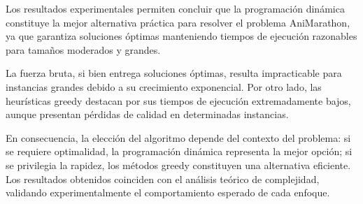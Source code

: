 Los resultados experimentales permiten concluir que la programación dinámica constituye la mejor alternativa práctica para resolver el problema AniMarathon, ya que garantiza soluciones óptimas manteniendo tiempos de ejecución razonables para tamaños moderados y grandes.

La fuerza bruta, si bien entrega soluciones óptimas, resulta impracticable para instancias grandes debido a su crecimiento exponencial. Por otro lado, las heurísticas greedy destacan por sus tiempos de ejecución extremadamente bajos, aunque presentan pérdidas de calidad en determinadas instancias.

En consecuencia, la elección del algoritmo depende del contexto del problema: si se requiere optimalidad, la programación dinámica representa la mejor opción; si se privilegia la rapidez, los métodos greedy constituyen una alternativa eficiente. Los resultados obtenidos coinciden con el análisis teórico de complejidad, validando experimentalmente el comportamiento esperado de cada enfoque.
